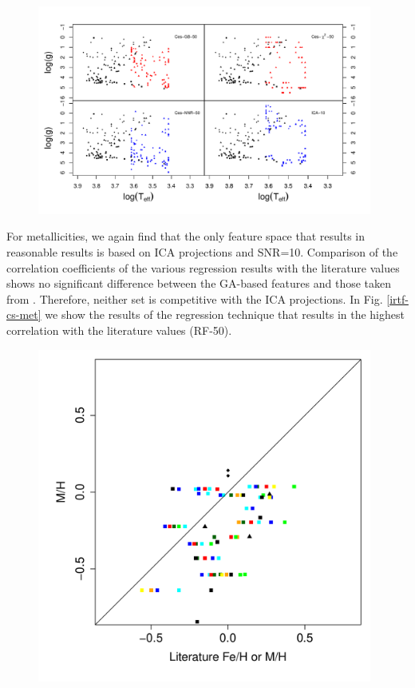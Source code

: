 
\begin {figure}
 \centering
  \includegraphics[width=11cm]{figs/irtf-figs/irtf-Cesseti.pdf}
  \caption{}
 \label{fig:irtf-ces}
\end {figure}
 
 
For metallicities, we again find that the only feature space that results in reasonable results is based on ICA projections and SNR=10. Comparison of the correlation coefficients of the various regression results with the literature values shows no significant difference between the GA-based features and those taken from \cite{cesetti}. Therefore, neither set is competitive with the ICA projections. In Fig. \ref{irtf-cs-met} we show the results of the regression technique that results in the highest correlation with the literature values (RF-50).  

\begin {figure}
\centering
\includegraphics[width=11cm]{figs/irtf-figs/M-CES.pdf}
\caption{}
\label{fig:irtf-ces-met}
\end {figure}
